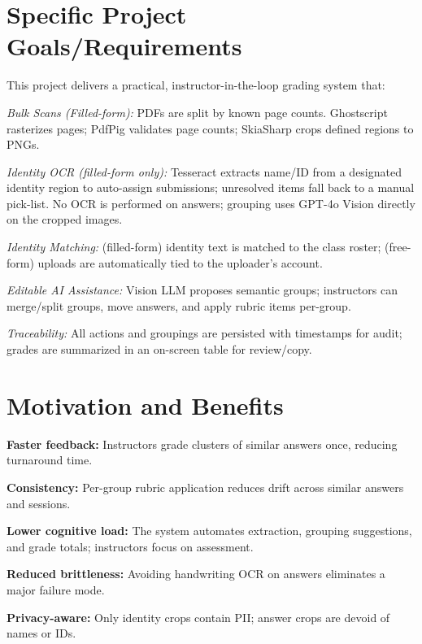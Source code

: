\documentclass[ms,twoside,print]{nuthesis}
\begin{document}
\section{Specific Project Goals/Requirements}
This project delivers a practical, instructor-in-the-loop grading system that:
\begin{compactitem}
  \item \textit{Bulk Scans (Filled-form):} PDFs are split by known page counts. Ghostscript rasterizes pages; PdfPig validates page counts; SkiaSharp crops defined regions to PNGs.
  \item \textit{Identity OCR (filled-form only):} Tesseract extracts name/ID from a designated identity region to auto-assign submissions; unresolved items fall back to a manual pick-list. No OCR is performed on answers; grouping uses GPT-4o Vision directly on the cropped images.
  \item \textit{Identity Matching:} (filled-form) identity text is matched to the class roster; (free-form) uploads are automatically tied to the uploader's account.
  \item \textit{Editable AI Assistance:} Vision LLM proposes semantic groups; instructors can merge/split groups, move answers, and apply rubric items per-group.
  \item \textit{Traceability:} All actions and groupings are persisted with timestamps for audit; grades are summarized in an on-screen table for review/copy.
\end{compactitem}

\section{Motivation and Benefits}
\begin{compactitem}
  \item \textbf{Faster feedback:} Instructors grade clusters of similar answers once, reducing turnaround time.
  \item \textbf{Consistency:} Per-group rubric application reduces drift across similar answers and sessions.
  \item \textbf{Lower cognitive load:} The system automates extraction, grouping suggestions, and grade totals; instructors focus on assessment.
  \item \textbf{Reduced brittleness:} Avoiding handwriting OCR on answers eliminates a major failure mode.
  \item \textbf{Privacy-aware:} Only identity crops contain PII; answer crops are devoid of names or IDs.
\end{compactitem}
\end{document}
